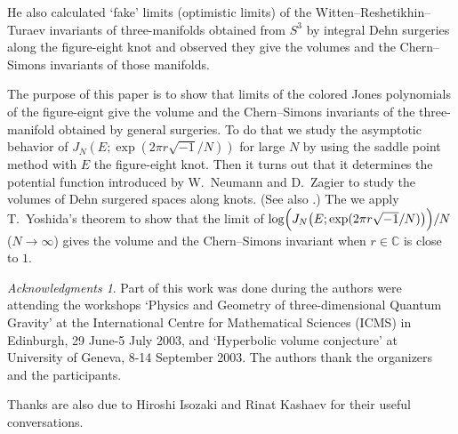 \documentclass[a4paper]{amsart}
\theoremstyle{plain}
\theoremstyle{definition}
\theoremstyle{remark}
\newtheorem*{ack}{Acknowledgments}
\newcommand{\C}{\mathbb{C}}
\numberwithin{equation}{section}
\begin{document}
\par
He also calculated
\cite{Murakami:SURIK00}
`fake' limits (optimistic limits) of the Witten--Reshetikhin--Turaev
invariants of three-manifolds obtained from $S^3$ by integral
Dehn surgeries along the figure-eight knot and observed they give the volumes
and the Chern--Simons invariants of those manifolds.
\par
The purpose of this paper is to show that limits of the colored
Jones polynomials of the figure-eignt give the volume and the Chern--Simons
invariants of the three-manifold obtained by general surgeries.
To do that we study the asymptotic behavior of $J_N(E;\exp(2\pi{r}\sqrt{-1}/N))$
for large $N$ by using the saddle point method with $E$ the figure-eight knot.
Then it turns out that it determines the potential function introduced by
W.~Neumann and D.~Zagier \cite{Neumann/Zagier:TOPOL85} to study the volumes of
Dehn surgered spaces along knots.
(See also \cite{Gukov:COMMP2005}.)
The we apply T.~Yoshida's theorem \cite{Yoshida:INVEM85} to show that the limit
of $\log\Bigl(J_N\bigl(E;\exp(2\pi{r}\sqrt{-1}/N)\bigl)\Bigr)/N$
($N\to\infty$) gives the volume and the Chern--Simons invariant when $r\in\C$ is
close to $1$.
\begin{ack} Part of this work was done during the authors were attending the workshops `Physics and Geometry of three-dimensional Quantum Gravity' at the International Centre for Mathematical Sciences (ICMS) in Edinburgh, 29 June-5 July 2003, and `Hyperbolic volume conjecture' at University of Geneva, 8-14 September 2003. The authors thank the organizers and the participants. \par Thanks are also due to Hiroshi Isozaki and Rinat Kashaev for their useful conversations. \end{ack} %
\end{document}
